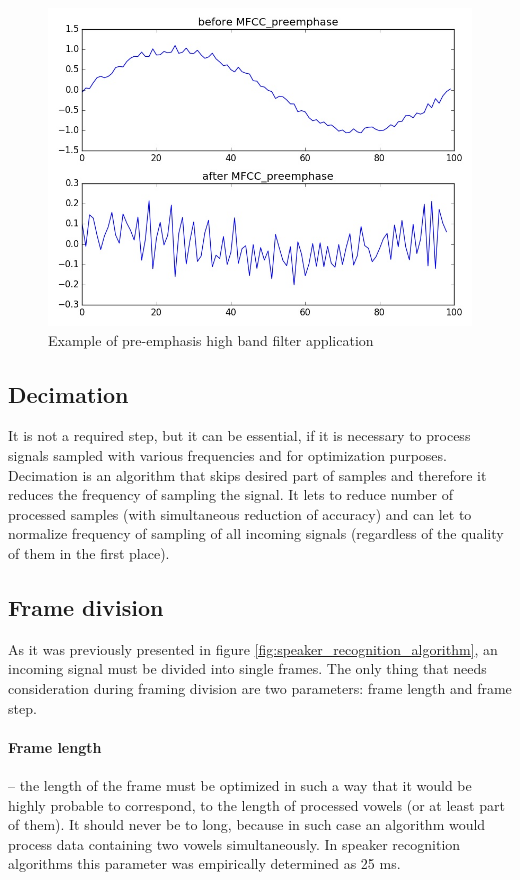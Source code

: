 \documentclass[magister]{dyplom}
\begin{document}
	\begin{figure}[!th]
		\centering
		\includegraphics[width=0.7\linewidth]{images/MFCC_preemphase}
		\caption{Example of pre-emphasis high band filter application}
		\label{fig:MFCC_preemphase}
	\end{figure}

	
	\subsection{Decimation}
	
	It is not a required step, but it can be essential, if it is necessary to process signals sampled with various frequencies and for optimization purposes. Decimation is an algorithm that skips desired part of samples and therefore it reduces the frequency of sampling the signal. It lets to reduce number of processed samples (with simultaneous reduction of accuracy) and can let to normalize frequency of sampling of all incoming signals (regardless of the quality of them in the first place).
	
	\subsection{Frame division}

	As it was previously presented in figure \ref{fig:speaker_recognition_algorithm}, an incoming signal must be divided into single frames. The only thing that needs consideration during framing division are two parameters: frame length and frame step.
	
	\paragraph{Frame length} -- the length of the frame must be optimized in such a way that it would be highly probable to correspond, to the length of processed vowels (or at least part of them). It should never be to long, because in such case an algorithm would process data containing two vowels simultaneously. In speaker recognition algorithms this parameter was empirically determined as 25 ms. 
	
\end{document}
